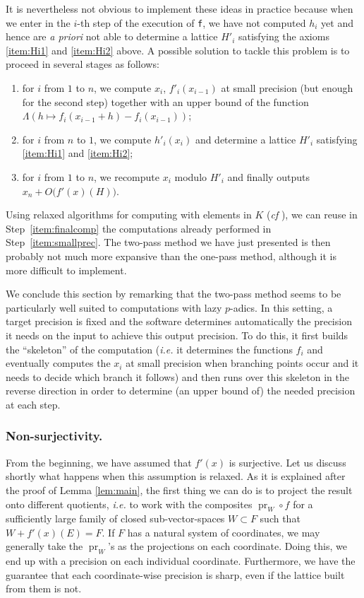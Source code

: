 \documentclass{lms}
\DeclareMathOperator{\pr}{pr}
\begin{document}
It is nevertheless not obvious to implement these ideas in practice
because when we enter in the $i$-th step of the execution of {\tt f},
we have not computed $h_i$ yet and hence are \emph{a priori} not able
to determine a lattice $H'_i$ satisfying the axioms \eqref{item:Hi1}
and \eqref{item:Hi2} above.
A possible solution to tackle this problem is to proceed in several
stages as follows: 
\begin{enumerate}[(1)]
\item \label{item:smallprec}
for $i$ from $1$ to $n$, we compute $x_i$, $f'_i(x_{i-1})$ 
at small precision (but enough for the second step) together with an
upper bound of the function $\Lambda(h \mapsto f_i(x_{i-1}+h) - 
f_i(x_{i-1}))$;
\item \label{item:determineHi}
for $i$ from $n$ to $1$, we compute $h'_i(x_i)$ and
determine a lattice $H'_i$ satisfying \eqref{item:Hi1} and 
\eqref{item:Hi2};
\item \label{item:finalcomp}
for $i$ from $1$ to $n$, we recompute $x_i$ modulo $H'_i$
and finally outputs $x_n + O\big(f'(x)(H)\big)$.
\end{enumerate}
Using relaxed algorithms for computing with elements in $K$ (\emph{cf} 
\cites{hoeven:02a, hoeven:07a, berthomieu-hoeven-lecerf:11a}), we can reuse in 
Step~\eqref{item:finalcomp} the computations already performed in 
Step~\eqref{item:smallprec}. The two-pass method we have just 
presented is then probably not much more expansive than the one-pass 
method, although it is more difficult to implement.

We conclude this section by remarking that the two-pass method seems 
to be particularly well suited to computations with lazy $p$-adics.
In this setting, a target precision is fixed and the software determines automatically the precision 
it needs on the input to achieve this output precision. To do this, it first 
builds the ``skeleton'' of the computation (\emph{i.e.} it determines the 
functions $f_i$ and eventually computes the $x_i$ at small precision when 
branching points occur and it needs to decide which branch it follows) 
and then runs over this skeleton in the reverse direction in order to 
determine (an upper bound of) the needed precision at each step.

\subsubsection*{Non-surjectivity.}

From the beginning, we have assumed that $f'(x)$ is surjective. Let us 
discuss shortly what happens when this assumption is relaxed. As it is 
explained after the proof of Lemma \ref{lem:main}, the first thing we 
can do is to project the result onto different quotients, \emph{i.e.} to 
work with the composites $\pr_W \circ f$ for a sufficiently large family 
of closed sub-vector-spaces $W \subset F$ such that $W + f'(x)(E) = F$. 
If $F$ has a natural system of coordinates, we may generally take the 
$\pr_W$'s as the projections on each coordinate. Doing this, we end up 
with a precision on each individual coordinate. Furthermore, we have the 
guarantee that each coordinate-wise precision is sharp, even if the lattice built
from them is not.
\end{document}
